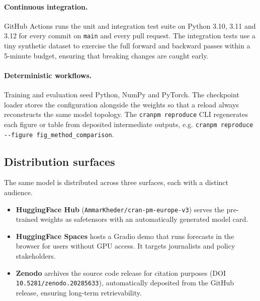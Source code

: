 \paragraph{Continuous integration.}
GitHub Actions runs the unit and integration test suite on Python
3.10, 3.11 and 3.12 for every commit on \texttt{main} and every
pull request. The integration tests use a tiny synthetic dataset to
exercise the full forward and backward passes within a 5-minute
budget, ensuring that breaking changes are caught early.

\paragraph{Deterministic workflows.}
Training and evaluation seed Python, NumPy and PyTorch. The
checkpoint loader stores the configuration alongside the weights so
that a reload always reconstructs the same model topology.
The \texttt{cranpm reproduce} CLI regenerates each figure or table
from deposited intermediate outputs, e.g.
\texttt{cranpm reproduce -{}-figure fig\_method\_comparison}.

\subsection{Distribution surfaces}

The same model is distributed across three surfaces, each with a
distinct audience.
\begin{itemize}
\item \textbf{HuggingFace Hub} (\texttt{AmmarKheder/cran-pm-europe-v3})
serves the pre-trained weights as safetensors with an automatically
generated model card.
\item \textbf{HuggingFace Spaces} hosts a Gradio demo that runs
forecasts in the browser for users without GPU access. It targets
journalists and policy stakeholders.
\item \textbf{Zenodo} archives the source code release for citation
purposes (DOI \texttt{10.5281/zenodo.20285633}), automatically
deposited from the GitHub release, ensuring long-term retrievability.
\end{itemize}
